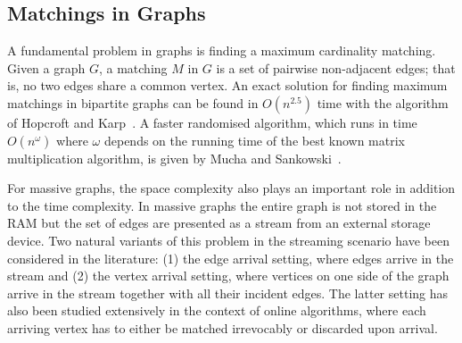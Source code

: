 \documentclass{scrartcl}
\begin{document}
%
%
%
\subsection{Matchings in Graphs}
A fundamental problem in graphs is finding a maximum cardinality matching. Given a graph $G$, a matching $M$ in $G$ is a set of pairwise non-adjacent edges; that is, no two edges share a common vertex. An exact solution for finding maximum matchings in bipartite graphs can be found in $O(n^{2.5})$ time with the algorithm of Hopcroft and Karp~\cite{Hopcroft}. A faster randomised algorithm, which runs in time $O(n^{\omega})$ where $\omega$ depends on the running time of the best known matrix multiplication algorithm, is given by Mucha and Sankowski~\cite{MS04}. 

For massive graphs, the space complexity also plays an important role in addition to the time complexity. In massive graphs the entire graph is not stored in the RAM but the set of edges are presented as a stream from an external storage device. Two natural variants of this problem in the streaming scenario have been considered in the literature: (1) the edge arrival setting, where edges arrive in the stream and (2) the vertex arrival setting, where vertices on one
side of the graph arrive in the stream together with all their incident edges. The latter setting has also
been studied extensively in the context of online algorithms, where each arriving vertex has to either be
matched irrevocably or discarded upon arrival. 
\end{document}
